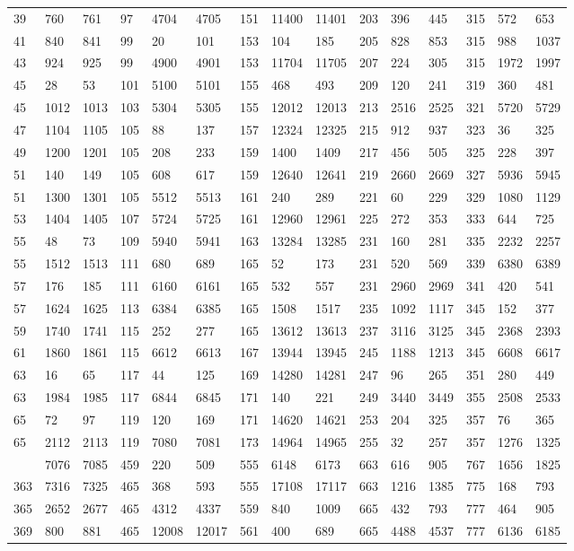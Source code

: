 \begin{longtable}{*4{A@{\hspace*{5mm}}A}}
	39&760&761&97&4704&4705&151&11400&11401&203&396&445&315&572&653\\
	41&840&841&99&20&101&153&104&185&205&828&853&315&988&1037\\
	43&924&925&99&4900&4901&153&11704&11705&207&224&305&315&1972&1997\\
	45&28&53&101&5100&5101&155&468&493&209&120&241&319&360&481\\
	45&1012&1013&103&5304&5305&155&12012&12013&213&2516&2525&321&5720&5729\\
	47&1104&1105&105&88&137&157&12324&12325&215&912&937&323&36&325\\
	49&1200&1201&105&208&233&159&1400&1409&217&456&505&325&228&397\\
	51&140&149&105&608&617&159&12640&12641&219&2660&2669&327&5936&5945\\
	51&1300&1301&105&5512&5513&161&240&289&221&60&229&329&1080&1129\\
	53&1404&1405&107&5724&5725&161&12960&12961&225&272&353&333&644&725\\
	55&48&73&109&5940&5941&163&13284&13285&231&160&281&335&2232&2257\\
	55&1512&1513&111&680&689&165&52&173&231&520&569&339&6380&6389\\
	57&176&185&111&6160&6161&165&532&557&231&2960&2969&341&420&541\\
	57&1624&1625&113&6384&6385&165&1508&1517&235&1092&1117&345&152&377\\
	59&1740&1741&115&252&277&165&13612&13613&237&3116&3125&345&2368&2393\\
	61&1860&1861&115&6612&6613&167&13944&13945&245&1188&1213&345&6608&6617\\
	63&16&65&117&44&125&169&14280&14281&247&96&265&351&280&449\\
	63&1984&1985&117&6844&6845&171&140&221&249&3440&3449&355&2508&2533\\
	65&72&97&119&120&169&171&14620&14621&253&204&325&357&76&365\\
	65&2112&2113&119&7080&7081&173&14964&14965&255&32&257&357&1276&1325\\
	&7076&7085&459&220&509&555&6148&6173&663&616&905&767&1656&1825\\
	363&7316&7325&465&368&593&555&17108&17117&663&1216&1385&775&168&793\\
	365&2652&2677&465&4312&4337&559&840&1009&665&432&793&777&464&905\\
	369&800&881&465&12008&12017&561&400&689&665&4488&4537&777&6136&6185\\

\end{longtable}
